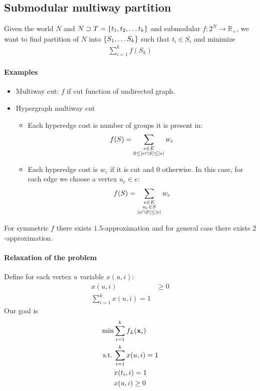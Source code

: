 \subsection{Submodular multiway partition}
Given the world $N$ and $N\supset T = \qty{t_1, t_2,\dots t_k}$ and submodular $f:2^N \to \mathbb{R}_+$, we want to find partition of $N$ into $\qty{S_1, \dots S_k}$ such that $t_i\in S_i$ and minimize
\begin{align}
\sum_{i=1}^k f(S_k)
\end{align}
\paragraph{Examples}
\begin{itemize}
	\item Multiway cut: $f$ if cut function of undirected graph. 
	\item Hypergraph multiway cut
	\begin{itemize}
		\item Each hyperedge cost is number of groups it is present in:
		\begin{align}
		f(S) = \sum_{\substack{e \in E\\0\leq\abs{e\cap S} \leq \abs{e}}} w_e
		\end{align}
		\item Each hyperedge cost is $w_e$ if it is cut and $0$ otherwise. In this case, for each edge we choose a vertex $u_e\in e$:
		\begin{align}
		f(S) = \sum_{\substack{e \in E\\u_e\in S\\\abs{e\cap S} \leq \abs{e}}} w_e
		\end{align}
	\end{itemize}
\end{itemize}

For symmetric $f$ there exists $1.5$-approximation and for general case there exists $2$-approximation.

\paragraph{Relaxation of the problem}
Define for each vertex $u$ variable $x(u,i)$:
\begin{align}
	x(u,i) &\geq 0\\
	\sum_{i=1}^k x(u,i) = 1
\end{align}
Our goal is
\begin{align}
\min &\sum_{i=1}^k f_L(\vb{x}_i)\\
\text{s.t.} \: & \sum_{i=1}^k x(u,i) = 1\\
& x(t_i,i) = 1\\
& x(u,i) \geq 0
\end{align}

